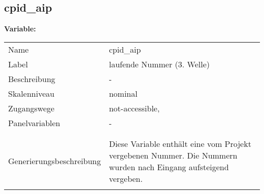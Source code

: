 	
	
	\subsection{cpid\_aip}
	\label{subSection:cpid_aip}

	\noindent\textbf{Variable:}\\
		\begin{tabular}{lL{11.3cm}}
			\label{tableVariable:cpid_aip}
			Name & cpid\_aip \\
			Label & laufende Nummer (3. Welle) \\
			Beschreibung & - \\
			Skalenniveau & nominal \\
			Zugangswege &
				not-accessible,
 \\
			Panelvariablen & -
			 \\
			 \\
 \\
					Generierungsbeschreibung & Diese Variable enthält eine vom Projekt vergebenen Nummer. Die Nummern wurden nach Eingang aufsteigend vergeben. 
				 \\	
			 \\
		\end{tabular}






	
	\newpage
